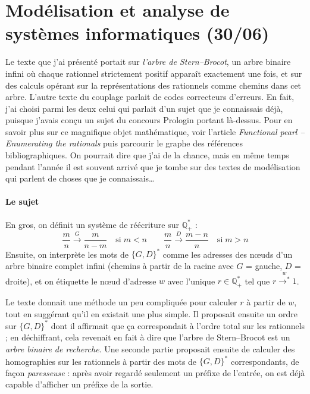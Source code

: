 \documentclass[a4paper, 11pt]{article}
\begin{document}
\newpage

\section*{Modélisation et analyse de systèmes informatiques (30/06)}

Le texte que j'ai présenté portait sur \emph{l'arbre de Stern--Brocot}, un arbre
binaire infini où chaque rationnel strictement positif apparaît exactement une
fois, et sur des calculs opérant sur la représentations des rationnels comme
chemins dans cet arbre. L'autre texte du couplage parlait de codes correcteurs
d'erreurs. En fait, j'ai choisi parmi les deux celui qui parlait d'un sujet que
je connaissais déjà, puisque j'avais conçu un sujet du concours Prologin portant
là-dessus. Pour en savoir plus sur ce magnifique objet mathématique, voir
l'article \emph{Functional pearl -- Enumerating the rationals} puis parcourir
le graphe des références bibliographiques. On pourrait dire que j'ai de la
chance, mais en même temps pendant l'année il est souvent arrivé que je tombe
sur des textes de modélisation qui parlent de choses que je connaissais…

\paragraph{Le sujet}

En gros, on définit un système de réécriture sur $\mathbb{Q}_+^*$ :
\[ \frac{m}{n} \xrightarrow{G} \frac{m}{n-m} \quad \text{si}\; m < n
 \qquad \frac{m}{n} \xrightarrow{D} \frac{m-n}{n} \quad \text{si}\; m > n \]
Ensuite, on interprète les mots de $\{G,D\}^*$ comme les adresses des nœuds d'un
arbre binaire complet infini (chemins à partir de la racine avec $G$ = gauche,
$D$ = droite), et on étiquette le nœud d'adresse $w$ avec l'unique $r \in
\mathbb{Q}_+^*$  tel que $r \overset{w}{\longrightarrow^*} 1$.

Le texte donnait une méthode un peu compliquée pour calculer $r$ à partir de
$w$, tout en suggérant qu'il en existait une plus simple. Il proposait ensuite
un ordre sur $\{G,D\}^*$ dont il affirmait que ça correspondait à l'ordre total
sur les rationnels ; en déchiffrant, cela revenait en fait à dire que l'arbre de
Stern--Brocot est un \emph{arbre binaire de recherche}. Une seconde partie
proposait ensuite de calculer des homographies sur les rationnels à partir des
mots de $\{G,D\}^*$ correspondants, de façon \emph{paresseuse} : après avoir
regardé seulement un préfixe de l'entrée, on est déjà capable d'afficher un
préfixe de la sortie.
\end{document}
